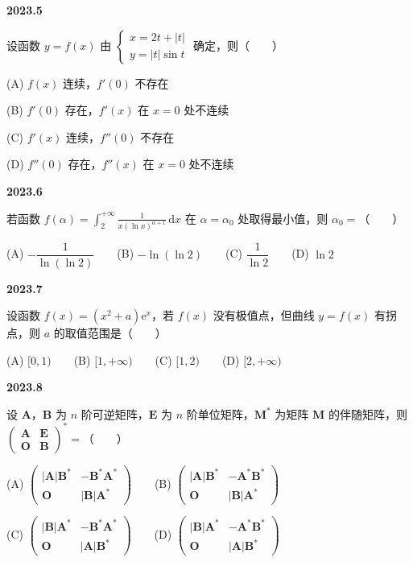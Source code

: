 \documentclass[UTF8,12pt,fontset=windows]{ctexart}
\begin{document}
\vfill
\newpage
{\large\bfseries 2023.5}

设函数 $y = f(x)$ 由 $\begin{cases} x = 2t + |t| \\ y = |t|\sin t \end{cases}$ 确定，则（　　）

(A) $f(x)$ 连续，$f'(0)$ 不存在

(B) $f'(0)$ 存在，$f'(x)$ 在 $x = 0$ 处不连续

(C) $f'(x)$ 连续，$f''(0)$ 不存在

(D) $f''(0)$ 存在，$f''(x)$ 在 $x = 0$ 处不连续

\vfill
\newpage
{\large\bfseries 2023.6}

若函数 $f(\alpha) = \int_{2}^{+\infty}\frac{1}{x(\ln x)^{\alpha+1}}\,\mathrm{d}x$ 在 $\alpha = \alpha_0$ 处取得最小值，则 $\alpha_0 =$（　　）

(A) $-\dfrac{1}{\ln(\ln 2)}$　　(B) $-\ln(\ln 2)$　　(C) $\dfrac{1}{\ln 2}$　　(D) $\ln 2$

\vfill
\newpage
{\large\bfseries 2023.7}

设函数 $f(x) = (x^2 + a)\mathrm{e}^x$，若 $f(x)$ 没有极值点，但曲线 $y = f(x)$ 有拐点，则 $a$ 的取值范围是（　　）

(A) $[0, 1)$　　(B) $[1, +\infty)$　　(C) $[1, 2)$　　(D) $[2, +\infty)$

\vfill
\newpage
{\large\bfseries 2023.8}

设 $\boldsymbol{A}$，$\boldsymbol{B}$ 为 $n$ 阶可逆矩阵，$\boldsymbol{E}$ 为 $n$ 阶单位矩阵，$\boldsymbol{M}^*$ 为矩阵 $\boldsymbol{M}$ 的伴随矩阵，则 $\begin{pmatrix} \boldsymbol{A} & \boldsymbol{E} \\ \boldsymbol{O} & \boldsymbol{B} \end{pmatrix}^* =$（　　）

(A) $\begin{pmatrix} |\boldsymbol{A}|\boldsymbol{B}^* & -\boldsymbol{B}^*\boldsymbol{A}^* \\ \boldsymbol{O} & |\boldsymbol{B}|\boldsymbol{A}^* \end{pmatrix}$　　(B) $\begin{pmatrix} |\boldsymbol{A}|\boldsymbol{B}^* & -\boldsymbol{A}^*\boldsymbol{B}^* \\ \boldsymbol{O} & |\boldsymbol{B}|\boldsymbol{A}^* \end{pmatrix}$

(C) $\begin{pmatrix} |\boldsymbol{B}|\boldsymbol{A}^* & -\boldsymbol{B}^*\boldsymbol{A}^* \\ \boldsymbol{O} & |\boldsymbol{A}|\boldsymbol{B}^* \end{pmatrix}$　　(D) $\begin{pmatrix} |\boldsymbol{B}|\boldsymbol{A}^* & -\boldsymbol{A}^*\boldsymbol{B}^* \\ \boldsymbol{O} & |\boldsymbol{A}|\boldsymbol{B}^* \end{pmatrix}$
\end{document}
